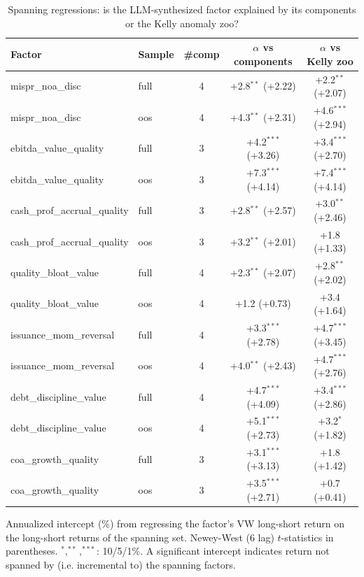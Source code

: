 \begin{table}[htbp]\centering
\caption{Spanning regressions: is the LLM-synthesized factor explained by its components or the Kelly anomaly zoo?}
\label{tab:spanning}
\begin{threeparttable}\footnotesize
\begin{tabular}{llccc}
\toprule
Factor & Sample & \#comp & $\alpha$ vs components & $\alpha$ vs Kelly zoo \\
\midrule
mispr\_noa\_disc & full & 4 & +2.8$^{**}$ (+2.22) & +2.2$^{**}$ (+2.07) \\
mispr\_noa\_disc & oos & 4 & +4.3$^{**}$ (+2.31) & +4.6$^{***}$ (+2.94) \\
ebitda\_value\_quality & full & 3 & +4.2$^{***}$ (+3.26) & +3.4$^{***}$ (+2.70) \\
ebitda\_value\_quality & oos & 3 & +7.3$^{***}$ (+4.14) & +7.4$^{***}$ (+4.14) \\
cash\_prof\_accrual\_quality & full & 3 & +2.8$^{**}$ (+2.57) & +3.0$^{**}$ (+2.46) \\
cash\_prof\_accrual\_quality & oos & 3 & +3.2$^{**}$ (+2.01) & +1.8 (+1.33) \\
quality\_bloat\_value & full & 4 & +2.3$^{**}$ (+2.07) & +2.8$^{**}$ (+2.02) \\
quality\_bloat\_value & oos & 4 & +1.2 (+0.73) & +3.4 (+1.64) \\
issuance\_mom\_reversal & full & 4 & +3.3$^{***}$ (+2.78) & +4.7$^{***}$ (+3.45) \\
issuance\_mom\_reversal & oos & 4 & +4.0$^{**}$ (+2.43) & +4.7$^{***}$ (+2.76) \\
debt\_discipline\_value & full & 4 & +4.7$^{***}$ (+4.09) & +3.4$^{***}$ (+2.86) \\
debt\_discipline\_value & oos & 4 & +5.1$^{***}$ (+2.73) & +3.2$^{*}$ (+1.82) \\
coa\_growth\_quality & full & 3 & +3.1$^{***}$ (+3.13) & +1.8 (+1.42) \\
coa\_growth\_quality & oos & 3 & +3.5$^{***}$ (+2.71) & +0.7 (+0.41) \\
\bottomrule
\end{tabular}
\begin{tablenotes}\footnotesize
\item Annualized intercept (\%) from regressing the factor's VW long-short return on the long-short returns of the spanning set. Newey-West (6 lag) $t$-statistics in parentheses. $^{*},^{**},^{***}$: 10/5/1\%. A significant intercept indicates return not spanned by (i.e. incremental to) the spanning factors.
\end{tablenotes}
\end{threeparttable}
\end{table}